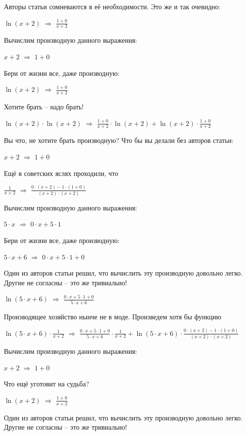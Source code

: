 \documentclass{article}
\begin{document}
Авторы статьи сомневаются в её необходимости. Это же и так очевидно:

$ \ln (x + 2)$ $\Rightarrow$ $\frac{1 + 0}{x + 2}$

Вычислим производную данного выражения:

$x + 2$ $\Rightarrow$ $1 + 0$

Бери от жизни все, даже производную:

$ \ln (x + 2)$ $\Rightarrow$ $\frac{1 + 0}{x + 2}$

Хотите брать -- надо брать!

$ \ln (x + 2) \cdot  \ln (x + 2)$ $\Rightarrow$ $\frac{1 + 0}{x + 2} \cdot  \ln (x + 2) +  \ln (x + 2) \cdot \frac{1 + 0}{x + 2}$

Вы что, не хотите брать производную? Что бы вы делали без авторов статьи:

$x + 2$ $\Rightarrow$ $1 + 0$

Ещё в советских яслях проходили, что

$\frac{1}{x + 2}$ $\Rightarrow$ $\frac{0 \cdot (x + 2) - 1 \cdot (1 + 0)}{(x + 2) \cdot (x + 2)}$

Вычислим производную данного выражения:

$5 \cdot x$ $\Rightarrow$ $0 \cdot x + 5 \cdot 1$

Бери от жизни все, даже производную:

$5 \cdot x + 6$ $\Rightarrow$ $0 \cdot x + 5 \cdot 1 + 0$

Один из авторов статьи решил, что вычислить эту производную довольно легко. Другие не согласны -- это же тривиально!

$ \ln (5 \cdot x + 6)$ $\Rightarrow$ $\frac{0 \cdot x + 5 \cdot 1 + 0}{5 \cdot x + 6}$

Производящее хозяйство нынче не в моде. Произведем хотя бы функцию

$ \ln (5 \cdot x + 6) \cdot \frac{1}{x + 2}$ $\Rightarrow$ $\frac{0 \cdot x + 5 \cdot 1 + 0}{5 \cdot x + 6} \cdot \frac{1}{x + 2} +  \ln (5 \cdot x + 6) \cdot \frac{0 \cdot (x + 2) - 1 \cdot (1 + 0)}{(x + 2) \cdot (x + 2)}$

Вычислим производную данного выражения:

$x + 2$ $\Rightarrow$ $1 + 0$

Что ещё уготовит на судьба?

$ \ln (x + 2)$ $\Rightarrow$ $\frac{1 + 0}{x + 2}$

Один из авторов статьи решил, что вычислить эту производную довольно легко. Другие не согласны -- это же тривиально!
\end{document}
